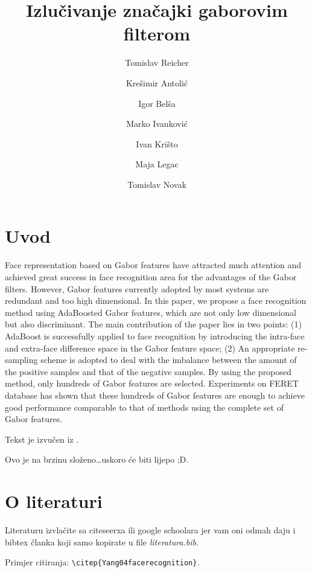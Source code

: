 \documentclass{article}
\begin{document}
\title{Izlučivanje značajki gaborovim filterom}
\author{Tomislav Reicher \and Krešimir Antolić \and Igor Belša \and Marko Ivanković \and Ivan Krišto \and Maja Legac \and Tomislav Novak}

\maketitle

\tableofcontents

\section{Uvod}
Face representation based on Gabor features have attracted much attention and
achieved great success in face recognition area for the advantages of the Gabor
filters. However, Gabor features currently adopted by most systems are redundant
and too high dimensional. In this paper, we propose a face recognition method
using AdaBoosted Gabor features, which are not only low dimensional but also
discriminant. The main contribution of the paper lies in two points: (1) AdaBoost
is successfully applied to face recognition by introducing the intra-face and
extra-face difference space in the Gabor feature space; (2) An appropriate
re-sampling scheme is adopted to deal with the imbalance between the amount of
the positive samples and that of the negative samples. By using the proposed
method, only hundreds of Gabor features are selected. Experiments on FERET
database has shown that these hundreds of Gabor features are enough to achieve
good performance comparable to that of methods using the complete set of Gabor
features.

Tekst je izvučen iz \citep{Yang04facerecognition}.

Ovo je na brzinu složeno\ldots uskoro će biti lijepo ;D.

\section{O literaturi}
Literaturu izvlačite sa citeseerxa ili google schoolara jer vam oni odmah daju
i bibtex članka koji samo kopirate u file \emph{literatura.bib}.

Primjer citiranja: \verb|\citep{Yang04facerecognition}|.



\end{document}
